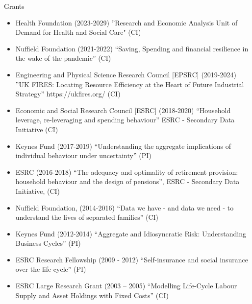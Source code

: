 \documentclass{resume} %
\begin{document}
\begin{rSection}{Grants}

\begin{itemize}
\item Health Foundation (2023-2029) ''Research and Economic Analysis Unit of Demand for Health and Social Care" (CI) 
\item Nuffield Foundation (2021-2022) ``Saving, Spending and financial resilience in the wake of the pandemic'' (CI) 
\item Engineering and Physical Science Research Council [EPSRC] (2019-2024) ''UK FIRES: Locating Resource Efficiency at the Heart of Future Industrial Strategy'' https://ukfires.org/ (CI) 
\item Economic and Social Research Council [ESRC] (2018-2020) “Household leverage, re-leveraging and spending behaviour” ESRC - Secondary Data Initiative (CI)
\item Keynes Fund (2017-2019) “Understanding the aggregate implications of individual behaviour under uncertainty” (PI)
\item ESRC (2016-2018) “The adequacy and optimality of retirement provision: household behaviour and the design of pensions”, ESRC - Secondary Data Initiative, (CI)
\item Nuffield Foundation, (2014-2016)  “Data we have - and data we need - to understand the lives of separated families” (CI) 
\item Keynes Fund (2012-2014) “Aggregate and Idiosyncratic Risk: Understanding Business Cycles” (PI)
\item ESRC Research Fellowship (2009 - 2012) “Self-insurance and social insurance over the life-cycle” (PI)
\item ESRC Large Research Grant (2003 -- 2005) “Modelling Life-Cycle Labour Supply and Asset Holdings with Fixed Costs” (CI)
\end{itemize}
\end{rSection}
\end{document}
